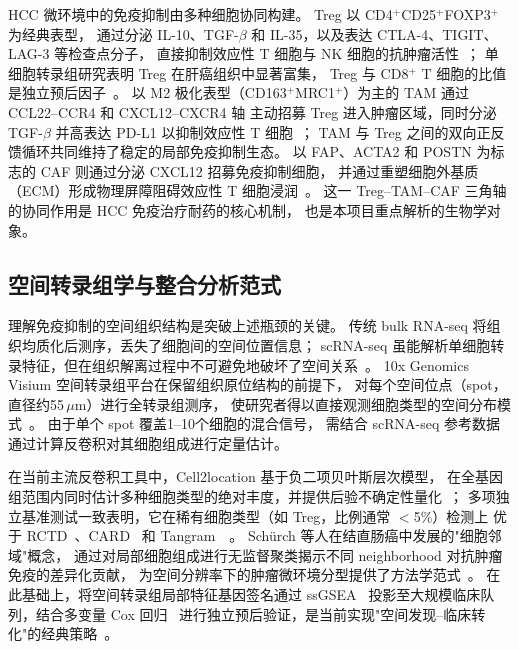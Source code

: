 \documentclass[12pt, a4paper]{ctexart}
\begin{document}
HCC 微环境中的免疫抑制由多种细胞协同构建。
Treg 以 CD4$^+$CD25$^+$FOXP3$^+$ 为经典表型，
通过分泌 IL-10、TGF-$\beta$ 和 IL-35，以及表达 CTLA-4、TIGIT、LAG-3 等检查点分子，
直接抑制效应性 T 细胞与 NK 细胞的抗肿瘤活性~\citep{sakaguchi2020regulatory}；
单细胞转录组研究表明 Treg 在肝癌组织中显著富集，
Treg 与 CD8$^+$ T 细胞的比值是独立预后因子~\citep{zheng2017landscape}。
以 M2 极化表型（CD163$^+$MRC1$^+$）为主的 TAM 通过 CCL22--CCR4 和 CXCL12--CXCR4 轴
主动招募 Treg 进入肿瘤区域，同时分泌 TGF-$\beta$ 并高表达 PD-L1 以抑制效应性 T 细胞~\citep{biswas2012macrophage,noy2014tumor}；
TAM 与 Treg 之间的双向正反馈循环共同维持了稳定的局部免疫抑制生态。
以 FAP、ACTA2 和 POSTN 为标志的 CAF 则通过分泌 CXCL12 招募免疫抑制细胞，
并通过重塑细胞外基质（ECM）形成物理屏障阻碍效应性 T 细胞浸润~\citep{kalluri2016biology,mariathasan2018tgfb}。
这一 Treg--TAM--CAF 三角轴的协同作用是 HCC 免疫治疗耐药的核心机制，
也是本项目重点解析的生物学对象。

\subsection{空间转录组学与整合分析范式}

理解免疫抑制的空间组织结构是突破上述瓶颈的关键。
传统 bulk RNA-seq 将组织均质化后测序，丢失了细胞间的空间位置信息；
scRNA-seq 虽能解析单细胞转录特征，但在组织解离过程中不可避免地破坏了空间关系~\citep{luecken2019current}。
10x Genomics Visium 空间转录组平台在保留组织原位结构的前提下，
对每个空间位点（spot，直径约55\,$\mu$m）进行全转录组测序，
使研究者得以直接观测细胞类型的空间分布模式~\citep{williams2022introduction}。
由于单个 spot 覆盖1--10个细胞的混合信号，
需结合 scRNA-seq 参考数据通过计算反卷积对其细胞组成进行定量估计。

在当前主流反卷积工具中，Cell2location 基于负二项贝叶斯层次模型，
在全基因组范围内同时估计多种细胞类型的绝对丰度，并提供后验不确定性量化~\citep{kleshchevnikov2022cell2location}；
多项独立基准测试一致表明，它在稀有细胞类型（如 Treg，比例通常 $<$5\%）检测上
优于 RCTD~\citep{cable2021robust}、CARD~\citep{ma2022integrative} 和 Tangram~\citep{biancalani2021deep}~\citep{li2022benchmarking,sang2023spotless,yan2023benchmarking}。
Schürch 等人在结直肠癌中发展的"细胞邻域"概念，
通过对局部细胞组成进行无监督聚类揭示不同 neighborhood 对抗肿瘤免疫的差异化贡献，
为空间分辨率下的肿瘤微环境分型提供了方法学范式~\citep{schurch2020coordinated}。
在此基础上，将空间转录组局部特征基因签名通过 ssGSEA~\citep{barbie2009systematic}
投影至大规模临床队列，结合多变量 Cox 回归~\citep{cox1972regression}
进行独立预后验证，是当前实现"空间发现--临床转化"的经典策略~\citep{hanzelmann2013gsva}。
\end{document}
